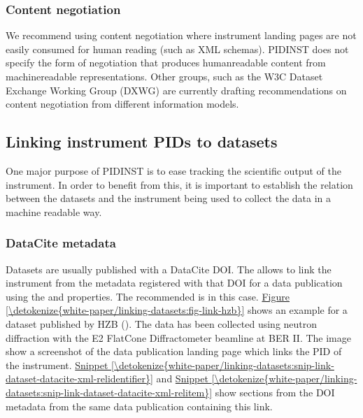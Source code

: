 \documentclass[a4paper,10pt,english]{sphinxmanual}
\begin{document}
\subsubsection{Content negotiation}
\label{\detokenize{white-paper/landing-page-encoding:content-negotiation}}
\sphinxAtStartPar
We recommend using content negotiation where instrument landing pages
are not easily consumed for human reading (such as XML schemas). PIDINST
does not specify the form of negotiation that produces human\sphinxhyphen{}readable
content from machine\sphinxhyphen{}readable representations. Other groups, such as the
W3C Dataset Exchange Working Group (DXWG) are currently drafting
recommendations on content negotiation from different information
models.%
\begin{footnote}[2]\sphinxAtStartFootnote
{}
%
\end{footnote}


\subsection{Linking instrument PIDs to datasets}
\label{\detokenize{white-paper/linking-datasets:linking-instrument-pids-to-datasets}}\label{\detokenize{white-paper/linking-datasets::doc}}
\sphinxAtStartPar
One major purpose of PIDINST is to ease tracking the scientific output
of the instrument.  In order to benefit from this, it is important to
establish the relation between the datasets and the instrument being
used to collect the data in a machine readable way.


\subsubsection{DataCite metadata}
\label{\detokenize{white-paper/linking-datasets:datacite-metadata}}
\sphinxAtStartPar
Datasets are usually published with a DataCite DOI.  The  allows to link the instrument from the metadata
registered with that DOI for a data publication using the
 and  properties.  The recommended
 is  in this case.  \hyperref[\detokenize{white-paper/linking-datasets:fig-link-hzb}]{Figure \ref{\detokenize{white-paper/linking-datasets:fig-link-hzb}}}
shows an example for a dataset published by HZB
().  The data has been collected using
neutron diffraction with the E2 \sphinxhyphen{} Flat\sphinxhyphen{}Cone Diffractometer beamline at
BER II.  The image show a screenshot of the data publication landing
page which links the PID of the instrument.
\hyperref[\detokenize{white-paper/linking-datasets:snip-link-dataset-datacite-xml-relidentifier}]{Snippet \ref{\detokenize{white-paper/linking-datasets:snip-link-dataset-datacite-xml-relidentifier}}} and
\hyperref[\detokenize{white-paper/linking-datasets:snip-link-dataset-datacite-xml-relitem}]{Snippet \ref{\detokenize{white-paper/linking-datasets:snip-link-dataset-datacite-xml-relitem}}} show sections from the
DOI metadata from the same data publication containing this link.
\end{document}

